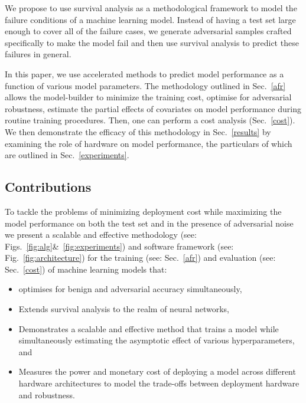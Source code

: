 \documentclass[conference]{IEEEtran}
\begin{document}
We propose to use survival analysis as a methodological framework to model the failure conditions of a machine learning model. Instead of having a test set large enough to cover all of the failure cases, we generate adversarial samples crafted specifically to make the model fail and then use survival analysis to predict these failures in general.

In this paper, we use accelerated methods to predict model performance as a function of various model parameters. The methodology outlined in Sec.~\ref{afr} allows the model-builder to minimize the training cost, optimise for adversarial robustness, estimate the partial effects of covariates on model performance during routine training procedures. Then, one can perform a cost analysis (Sec.~\ref{cost}). We then demonstrate the efficacy of this methodology in Sec.~\ref{results} by examining the role of hardware on model performance, the particulars of which are outlined in Sec.~\ref{experiments}.


\subsection{Contributions}
To tackle the problems of minimizing deployment cost while maximizing the model performance on both the test set and in the presence of adversarial noise we present a scalable and effective methodology (see: Figs.~\ref{fig:alg}\&~\ref{fig:experiments}) and software framework (see: Fig.~\ref{fig:architecture}) for the training (see: Sec.~\ref{afr}) and evaluation (see: Sec.~\ref{cost}) of machine learning models that:
\begin{itemize}
    \item optimises for benign and adversarial accuracy simultaneously,
    \item Extends survival analysis to the realm of neural networks, 
    \item Demonstrates a scalable and effective method that trains a model while simultaneously estimating the asymptotic effect of various hyperparameters, and
    \item Measures the power and monetary cost of deploying a model across different hardware architectures to model the trade-offs between deployment hardware and robustness.   
\end{itemize}
\end{document}

